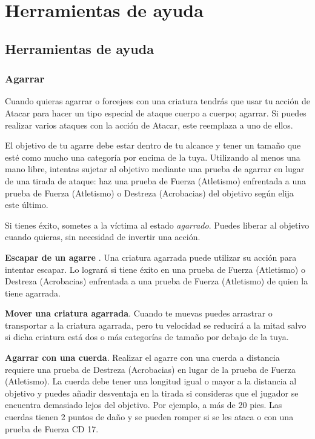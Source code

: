 \documentclass[10pt,twoside,twocolumn,openany]{dndbook}
\begin{document}
\part*{Herramientas de ayuda}

\chapter*{Herramientas de ayuda}

\section*{Agarrar}
Cuando quieras agarrar o forcejees con una criatura tendrás que usar tu acción de Atacar para 
hacer un tipo especial de ataque cuerpo a cuerpo; agarrar. Si puedes realizar varios ataques 
con la acción de Atacar, este reemplaza a uno de ellos.

El objetivo de tu agarre debe estar dentro de tu alcance y tener un tamaño que esté como mucho 
una categoría por encima de la tuya. Utilizando al menos una mano libre, intentas sujetar al 
objetivo mediante una prueba de agarrar en lugar de una tirada de ataque: haz una prueba de 
Fuerza (Atletismo) enfrentada a una prueba de Fuerza (Atletismo) o Destreza (Acrobacias) del 
objetivo según elija este último.

Si tienes éxito, sometes a la víctima al estado \emph{agarrado}. Puedes liberar al objetivo 
cuando quieras, sin necesidad de invertir una acción. 

\textbf{Escapar de un agarre} . Una criatura agarrada puede utilizar su acción para intentar 
escapar. Lo logrará si tiene éxito en una prueba de Fuerza (Atletismo) o Destreza (Acrobacias) 
enfrentada a una prueba de Fuerza (Atletismo) de quien la tiene agarrada.

\textbf{Mover una criatura agarrada}. Cuando te muevas puedes arrastrar o transportar a la 
criatura agarrada, pero tu velocidad se reducirá a la mitad salvo si dicha criatura está dos o 
más categorías de tamaño por debajo de la tuya.

\textbf{Agarrar con una cuerda}. Realizar el agarre con una cuerda a distancia requiere una 
prueba de Destreza (Acrobacias) en lugar de la prueba de Fuerza (Atletismo). La cuerda debe 
tener una longitud igual o mayor a la distancia al objetivo y puedes añadir desventaja en la 
tirada si consideras que el jugador se encuentra demasiado lejos del objetivo. Por ejemplo, 
a más de 20 pies. Las cuerdas tienen 2 puntos de daño y se pueden romper si se les ataca o con 
una prueba de Fuerza CD 17.
\end{document}
